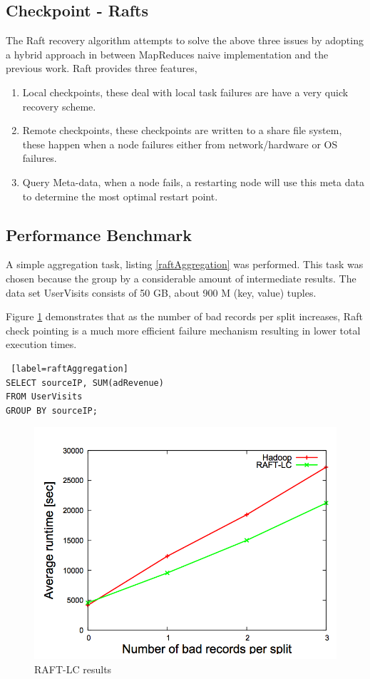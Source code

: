 \documentclass[10pt,twocolumn]{IEEEtran11}
\begin{document}
\subsection{Checkpoint - Rafts}

The Raft recovery algorithm attempts to solve the above three issues by adopting a hybrid approach in between MapReduces naive implementation and the previous work.  Raft provides three features,

\begin{enumerate}
	\item Local checkpoints, these deal with local task failures are have a very quick recovery scheme.
	\item Remote checkpoints, these checkpoints are written to a share file system, these happen when a node failures either from network/hardware or OS failures.
	\item Query Meta-data, when a node fails, a restarting node will use this meta data to determine the most optimal restart point.
\end{enumerate}


\subsection{Performance Benchmark}
A simple aggregation task, listing \ref{raftAggregation} was performed.  This task was chosen because the group by a considerable amount of intermediate results.  The data set UserVisits consists of 50 GB, about 900 M (key, value) tuples.
\par
Figure \ref{fig:raftPerformance} demonstrates that as the number of bad records per split increases, Raft check pointing is a much more efficient failure mechanism resulting in lower total execution times. 

\begin{lstlisting} [label=raftAggregation]
SELECT sourceIP, SUM(adRevenue)
FROM UserVisits
GROUP BY sourceIP;
\end{lstlisting}

\begin{figure}[h]
	\centering
	\includegraphics[scale=0.6]{images/raftBenchmark.png}
	\caption{ RAFT-LC results \protect\cite{quiane2011rafting}}
	\label{fig:raftPerformance}
\end{figure}
\end{document}
